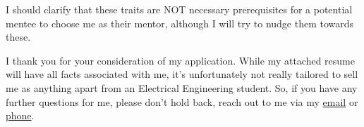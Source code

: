 \documentclass[color, 10pt, letterpaper]{coverletter}
\begin{document}
     I should clarify that these traits are NOT necessary prerequisites for a potential mentee to choose me as their mentor, although I will try to nudge them towards these. \Laughey

    I thank you for your consideration of my application. While my attached resume will have all facts associated with me, it's unfortunately not really tailored to sell me as anything apart from an Electrical Engineering student. So, if you have any further questions for me, please don't hold back, reach out to me via my \href{mailto:aryan.jha@wsu.edu}{email} or \href{tel:509-338-8770}{phone}.
\end{document}

